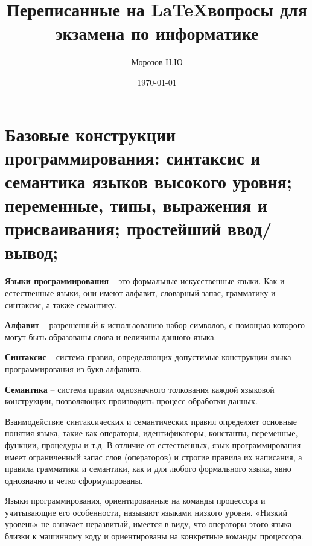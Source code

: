 \documentclass[14pt,a4paper]{article} %
\title{Переписанные на \LaTeX вопросы для экзамена по информатике}
\author{Морозов Н.Ю}
\date{\today}
\begin{document}

\maketitle

\newpage

\tableofcontents

\newpage


\section{Базовые конструкции программирования: синтаксис и семантика языков высокого уровня; переменные, типы, выражения и присваивания; простейший ввод/вывод;}

{\bfseries Языки программирования} – это формальные искусственные языки. Как и естественные языки, они имеют алфавит, словарный запас, грамматику и синтаксис, а также семантику.

{\bfseries Алфавит} – разрешенный к использованию набор символов, с помощью которого могут быть образованы слова и величины данного языка.

{\bfseries Синтаксис} – система правил, определяющих допустимые конструкции языка программирования из букв алфавита.

{\bfseries Семантика} – система правил однозначного толкования каждой языковой конструкции, позволяющих производить процесс обработки данных.

Взаимодействие синтаксических и семантических правил определяет основные понятия языка, такие как операторы, идентификаторы, константы, переменные, функции, процедуры и т.д. В отличие от естественных, язык программирования имеет ограниченный запас слов (операторов) и строгие правила их написания, а правила грамматики и семантики, как и для любого формального языка, явно однозначно и четко сформулированы.

Языки программирования, ориентированные на команды процессора и учитывающие его особенности, называют языками низкого уровня. «Низкий уровень» не означает неразвитый, имеется в виду, что операторы этого языка близки к машинному коду и ориентированы на конкретные команды процессора.
\end{document}
